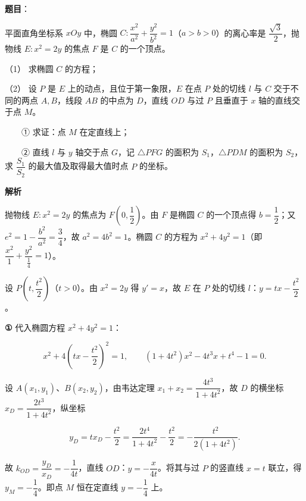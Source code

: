 \begin{answer}

\textbf{题目}：

平面直角坐标系 \(xOy\) 中，椭圆 \(C:\dfrac{x^{2}}{a^{2}}+\dfrac{y^{2}}{b^{2}}=1\)（\(a>b>0\)）的离心率是 \(\dfrac{\sqrt{3}}{2}\)，抛物线 \(E:x^{2}=2y\) 的焦点 \(F\) 是 \(C\) 的一个顶点。

（1） 求椭圆 \(C\) 的方程；

（2） 设 \(P\) 是 \(E\) 上的动点，且位于第一象限，\(E\) 在点 \(P\) 处的切线 \(l\) 与 \(C\) 交于不同的两点 \(A,B\)，线段 \(AB\) 的中点为 \(D\)，直线 \(OD\) 与过 \(P\) 且垂直于 \(x\) 轴的直线交于点 \(M\)。

　　① 求证：点 \(M\) 在定直线上；

　　② 直线 \(l\) 与 \(y\) 轴交于点 \(G\)，记 \(\triangle PFG\) 的面积为 \(S_{1}\)，\(\triangle PDM\) 的面积为 \(S_{2}\)，求 \(\dfrac{S_{1}}{S_{2}}\) 的最大值及取得最大值时点 \(P\) 的坐标。
\nopagebreak[4]
\begin{center}\end{center}
\nopagebreak[4]
\textbf{解析}


抛物线 \(E:x^{2}=2y\) 的焦点为 \(F\left(0,\dfrac{1}{2}\right)\)。由 \(F\) 是椭圆 \(C\) 的一个顶点得 \(b=\dfrac{1}{2}\)；又 \(e^{2}=1-\dfrac{b^{2}}{a^{2}}=\dfrac{3}{4}\)，故 \(a^{2}=4b^{2}=1\)。椭圆 \(C\) 的方程为 \(x^{2}+4y^{2}=1\)（即 \(\dfrac{x^{2}}{1}+\dfrac{y^{2}}{\frac{1}{4}}=1\)）。


设 \(P\left(t,\dfrac{t^{2}}{2}\right)\)（\(t>0\)）。由 \(x^{2}=2y\) 得 \(y'=x\)，故 \(E\) 在 \(P\) 处的切线 \(l\)：\(y=tx-\dfrac{t^{2}}{2}\)。

\textbf{①} 代入椭圆方程 \(x^{2}+4y^{2}=1\)：

\nopagebreak[4]
\[
x^{2}+4\left(tx-\dfrac{t^{2}}{2}\right)^{2}=1,\qquad (1+4t^{2})x^{2}-4t^{3}x+t^{4}-1=0.
\]

设 \(A(x_{1},y_{1})\)、\(B(x_{2},y_{2})\)，由韦达定理 \(x_{1}+x_{2}=\dfrac{4t^{3}}{1+4t^{2}}\)，故 \(D\) 的横坐标 \(x_{D}=\dfrac{2t^{3}}{1+4t^{2}}\)，纵坐标

\nopagebreak[4]
\[
y_{D}=tx_{D}-\dfrac{t^{2}}{2}=\dfrac{2t^{4}}{1+4t^{2}}-\dfrac{t^{2}}{2}=-\dfrac{t^{2}}{2(1+4t^{2})}.
\]

故 \(k_{OD}=\dfrac{y_{D}}{x_{D}}=-\dfrac{1}{4t}\)，直线 \(OD\)：\(y=-\dfrac{x}{4t}\)。将其与过 \(P\) 的竖直线 \(x=t\) 联立，得 \(y_{M}=-\dfrac{1}{4}\)。即点 \(M\) 恒在定直线 \(y=-\dfrac{1}{4}\) 上。


\end{answer}

